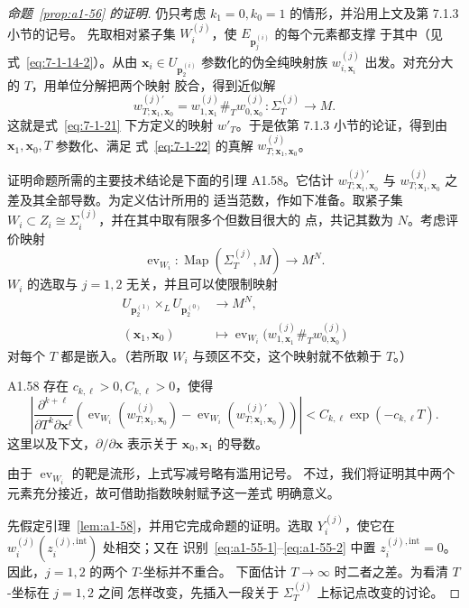 \begin{proof}[命题~\ref{prop:a1-56} 的证明]
仍只考虑 $k_1=0,k_0=1$ 的情形，并沿用上文及第 7.1.3 小节的记号。
先取相对紧子集 $W_i^{(j)}$，使 $E_{\mathbf p_j^{(i)}}$ 的每个元素都支撑
于其中（见式~\eqref{eq:7-1-14-2}）。从由
$\mathbf x_i\in U_{\mathbf p_2^{(i)}}$ 参数化的伪全纯映射族
$w_{i,\mathbf x_i}^{(j)}$ 出发。对充分大的 $T$，用单位分解把两个映射
胶合，得到近似解
\[
 w_{T;\mathbf x_1,\mathbf x_0}^{(j)\prime}
 =w_{1,\mathbf x_1}^{(j)}\mathbin{\#_T}
  w_{0,\mathbf x_0}^{(j)}
 \colon\Sigma_T^{(j)}\longrightarrow M.
\]
这就是式~\eqref{eq:7-1-21} 下方定义的映射 $w'_T$。于是依第 7.1.3
小节的论证，得到由 $\mathbf x_1,\mathbf x_0,T$ 参数化、满足
式~\eqref{eq:7-1-22} 的真解
$w_{T;\mathbf x_1,\mathbf x_0}^{(j)}$。

证明命题所需的主要技术结论是下面的引理 A1.58。它估计
$w_{T;\mathbf x_1,\mathbf x_0}^{(j)\prime}$ 与
$w_{T;\mathbf x_1,\mathbf x_0}^{(j)}$ 之差及其全部导数。为定义估计所用的
适当范数，作如下准备。取紧子集
$W_i\subset Z_i\cong\Sigma_i^{(j)}$，并在其中取有限多个但数目很大的
点，共记其数为 $N$。考虑评价映射
\[
 \operatorname{ev}_{W_i}\colon
 \operatorname{Map}(\Sigma_T^{(j)},M)\longrightarrow M^N.
\]
$W_i$ 的选取与 $j=1,2$ 无关，并且可以使限制映射
\[
 \begin{aligned}
 U_{\mathbf p_2^{(1)}}\mathbin{\times_L}U_{\mathbf p_2^{(0)}}
 &\longrightarrow M^N,\\
 (\mathbf x_1,\mathbf x_0)
 &\longmapsto
 \operatorname{ev}_{W_i}
 \bigl(w_{1,\mathbf x_1}^{(j)}\mathbin{\#_T}
 w_{0,\mathbf x_0}^{(j)}\bigr)
 \end{aligned}
\]
对每个 $T$ 都是嵌入。（若所取 $W_i$ 与颈区不交，这个映射就不依赖于
$T$。）

\begin{lemma}{A1.58}\label{lem:a1-58}
存在 $c_{k,\ell}>0,C_{k,\ell}>0$，使得
\[
 \left\lvert
 \frac{\partial^{k+\ell}}{\partial T^k\partial\mathbf x^\ell}
 \left(
 \operatorname{ev}_{W_i}(w_{T;\mathbf x_1,\mathbf x_0}^{(j)})
 -
 \operatorname{ev}_{W_i}(w_{T;\mathbf x_1,\mathbf x_0}^{(j)\prime})
 \right)
 \right\rvert
 <C_{k,\ell}\exp(-c_{k,\ell}T).
\]
这里以及下文，$\partial/\partial\mathbf x$ 表示关于
$\mathbf x_0,\mathbf x_1$ 的导数。
\end{lemma}

由于 $\operatorname{ev}_{W_i}$ 的靶是流形，上式写减号略有滥用记号。
不过，我们将证明其中两个元素充分接近，故可借助指数映射赋予这一差式
明确意义。

先假定引理~\ref{lem:a1-58}，并用它完成命题的证明。选取
$Y_i^{(j)}$，使它在 $w_i^{(j)}(z_i^{(j),\mathrm{int}})$ 处相交；又在
识别~\eqref{eq:a1-55-1}--\eqref{eq:a1-55-2} 中置
$z_i^{(j),\mathrm{int}}=0$。因此，$j=1,2$ 的两个 $T$-坐标并不重合。
下面估计 $T\to\infty$ 时二者之差。为看清 $T$-坐标在 $j=1,2$ 之间
怎样改变，先插入一段关于 $\Sigma_T^{(j)}$ 上标记点改变的讨论。


\end{proof}
